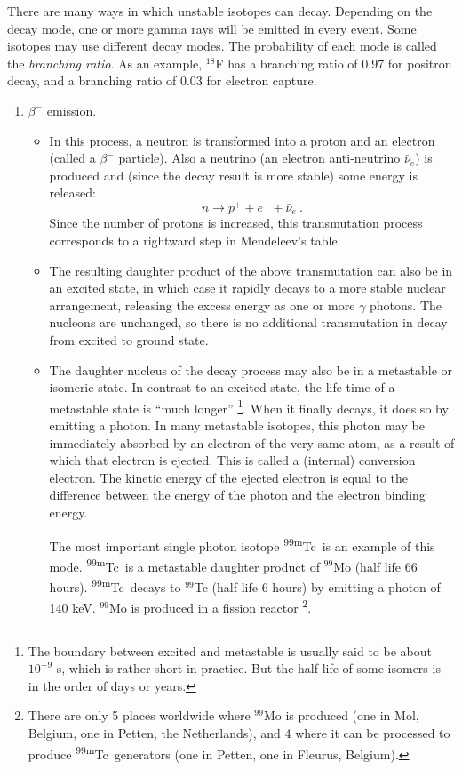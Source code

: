\documentclass[11pt,oneside]{article}
\begin{document}
There are many ways in which unstable isotopes can decay. Depending on
the decay mode, one or more gamma rays will be emitted in every
event. Some isotopes may use different decay modes. The probability of
each mode is called the {\em branching ratio}. As an example, $^{18}$F
has a branching ratio of 0.97 for positron decay, and a branching
ratio of 0.03 for electron capture.
\begin{enumerate}

\item $\beta^-$ emission.
%
\begin{itemize}
\item
In this process, a neutron is transformed into a proton and an
electron (called a $\beta^-$ particle).  Also a neutrino (an electron
anti-neutrino $\bar\nu_e$) is produced and (since the decay result is
more stable) some energy is released:
\begin{equation}
 n \rightarrow p^+ + e^- + \bar\nu_e \ .
\end{equation}
Since the number of protons is increased, this transmutation process
corresponds to a rightward step in Mendeleev's table.

\item
The resulting daughter product of the above transmutation can also be in an
excited state, in which case it rapidly decays to a more stable nuclear
arrangement, releasing the excess energy as one or more $\gamma$ photons.  The
nucleons are unchanged, so there is no additional transmutation in decay from
excited to ground state.

\item
The daughter nucleus of the decay process may also be in a metastable or
isomeric state. In contrast to an excited state, the life time of a metastable
state is ``much longer''
\footnote{The boundary between excited and metastable is usually said
  to be about $10^{-9}$ s, which is rather short in practice. But the
  half life of some isomers is in the order of days or years.}.  
%
When it finally decays, it does so by emitting a photon. In many
metastable isotopes, this photon may be immediately absorbed by an
electron of the very same atom, as a result of which that electron is
ejected.  This is called a (internal) conversion electron. The kinetic
energy of the ejected electron is equal to the difference between the
energy of the photon and the electron binding energy. 

The most important single photon isotope \textsuperscript{99m}Tc\ is an example of this
mode. \textsuperscript{99m}Tc\ is a metastable daughter product of $^{99}$Mo (half life 66
hours). \textsuperscript{99m}Tc\ decays to $^{99}$Tc (half life 6 hours) by emitting a
photon of 140 keV. $^{99}$Mo is produced in a fission reactor
\footnote{There are only 5 places worldwide where $^{99}$Mo is
  produced (one in Mol, Belgium, one in Petten, the Netherlands), and
  4 where it can be processed to produce \textsuperscript{99m}Tc\ generators (one in
  Petten, one in Fleurus, Belgium).}.
\end{itemize}


\end{enumerate}
\end{document}
